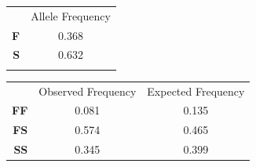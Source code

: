\begin{solution}
\begin{minipage}{0.3\linewidth}
	\begin{tabular}{rc}
	&	Allele Frequency\\[3ex]
	\Large\textbf{F} & 0.368 \\[3ex]
	\Large\textbf{S} & 0.632 \\[3ex]
	\Large\null	 & \null\\
	\end{tabular}
\end{minipage}\hfill
\begin{minipage}{0.6\linewidth}
	\begin{tabular}{rcc}
		&	Observed Frequency		&	Expected Frequency\\[3ex]
		\large\textbf{FF} & 0.081 & 0.135 \\[3ex]
		\large\textbf{FS} & 0.574 & 0.465 \\[3ex]
		\large\textbf{SS} & 0.345 & 0.399 \\
	\end{tabular}
\end{minipage}
\end{solution}
